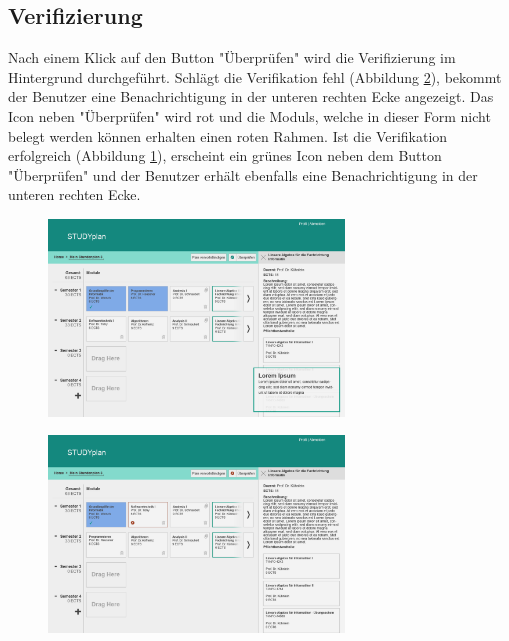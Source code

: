 \subsection{Verifizierung}
\label{subsec:gui-verifizierung}
Nach einem Klick auf den Button "Überprüfen" wird die Verifizierung im Hintergrund durchgeführt.\newline
Schlägt die Verifikation fehl (Abbildung \ref{fig:gui-verifizierung-2}), bekommt der \gls{Benutzer} eine Benachrichtigung in der unteren rechten Ecke angezeigt. Das Icon neben "Überprüfen" wird rot und die \glspl{Modul}, welche in dieser Form nicht belegt werden können erhalten einen roten Rahmen.\newline
Ist die Verifikation erfolgreich (Abbildung \ref{fig:gui-verifizierung-1}), erscheint ein grünes Icon neben dem Button "Überprüfen" und der \gls{Benutzer} erhält ebenfalls eine Benachrichtigung in der unteren rechten Ecke.
\begin{figure}[!htb]
	\caption{}
	\label{fig:gui-verifizierung-1}
	\centering
	\includegraphics[width=0.7\textwidth]{../GUI/ergebnisse/verifizierung-1.png}
\end{figure}
\begin{figure}[!htb]
	\caption{}
	\label{fig:gui-verifizierung-2}
	\centering
	\includegraphics[width=0.7\textwidth]{../GUI/ergebnisse/verifizierung-2.png}
\end{figure}

